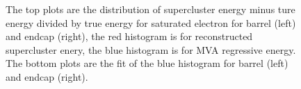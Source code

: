 \begin{figure}[bh]
\begin{center}
\begin{tabular}{cc}
    \end{tabular}
    \caption{ The top plots are the distribution of supercluster energy minus ture energy divided by true energy for saturated electron for barrel (left) and endcap (right), the red histogram is for reconstructed supercluster enery, the blue histogram is for MVA regressive energy. The bottom plots are the fit of the blue histogram for barrel (left) and endcap (right).}
    \label{fig:MLP_B_E}
  \end{center}
\end{figure}
